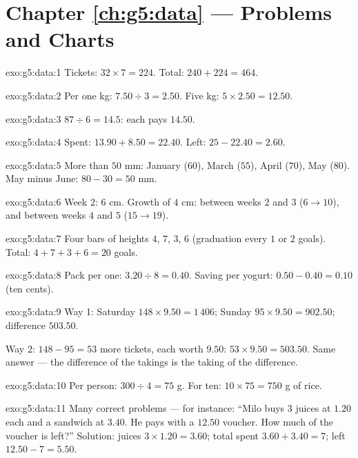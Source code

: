 \section*{Chapter \ref{ch:g5:data} --- Problems and Charts}

\begin{solution}{exo:g5:data:1}
Tickets: $32 \times 7 = 224$. Total: $240 + 224 = 464$.
\end{solution}

\begin{solution}{exo:g5:data:2}
Per one kg: $7.50 \div 3 = 2.50$. Five kg:
$5 \times 2.50 = 12.50$.
\end{solution}

\begin{solution}{exo:g5:data:3}
$87 \div 6 = 14.5$: each pays $14.50$.
\end{solution}

\begin{solution}{exo:g5:data:4}
Spent: $13.90 + 8.50 = 22.40$. Left: $25 - 22.40 = 2.60$.
\end{solution}

\begin{solution}{exo:g5:data:5}
More than $50$ mm: January ($60$), March ($55$), April ($70$), May
($80$). May minus June: $80 - 30 = 50$ mm.
\end{solution}

\begin{solution}{exo:g5:data:6}
Week $2$: $6$ cm. Growth of $4$ cm: between weeks $2$ and $3$
($6 \to 10$), and between weeks $4$ and $5$ ($15 \to 19$).
\end{solution}

\begin{solution}{exo:g5:data:7}
Four bars of heights $4$, $7$, $3$, $6$ (graduation every $1$ or
$2$ goals). Total: $4 + 7 + 3 + 6 = 20$ goals.
\end{solution}

\begin{solution}{exo:g5:data:8}
Pack per one: $3.20 \div 8 = 0.40$. Saving per yogurt:
$0.50 - 0.40 = 0.10$ (ten cents).
\end{solution}

\begin{solution}{exo:g5:data:9}
Way 1: Saturday $148 \times 9.50 = 1\,406$; Sunday
$95 \times 9.50 = 902.50$; difference $503.50$.

Way 2: $148 - 95 = 53$ more tickets, each worth $9.50$:
$53 \times 9.50 = 503.50$. Same answer --- the difference of the
takings is the taking of the difference.
\end{solution}

\begin{solution}{exo:g5:data:10}
Per person: $300 \div 4 = 75$ g. For ten:
$10 \times 75 = 750$ g of rice.
\end{solution}

\begin{solution}{exo:g5:data:11}
Many correct problems --- for instance: ``Milo buys $3$ juices at
$1.20$ each and a sandwich at $3.40$. He pays with a $12.50$
voucher. How much of the voucher is left?'' Solution: juices
$3 \times 1.20 = 3.60$; total spent $3.60 + 3.40 = 7$; left
$12.50 - 7 = 5.50$.
\end{solution}
